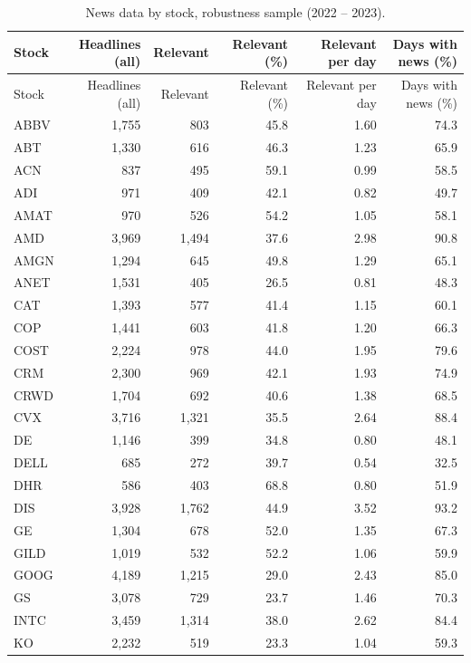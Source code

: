 \documentclass[12pt,a4paper]{article}
\begin{document}
\begin{longtable}{lrrrrr}
\caption[News data by stock, robustness sample]{News data by stock, robustness sample (2022 -- 2023).}\label{tab:app-stock-news-rob}\\
\toprule
Stock & Headlines (all) & Relevant & Relevant (\%) & Relevant per day & Days with news (\%) \\
\midrule
\endfirsthead
\toprule
Stock & Headlines (all) & Relevant & Relevant (\%) & Relevant per day & Days with news (\%) \\
\midrule
\endhead
\bottomrule
\endfoot
ABBV & 1{,}755 & 803 & 45.8 & 1.60 & 74.3 \\
ABT & 1{,}330 & 616 & 46.3 & 1.23 & 65.9 \\
ACN & 837 & 495 & 59.1 & 0.99 & 58.5 \\
ADI & 971 & 409 & 42.1 & 0.82 & 49.7 \\
AMAT & 970 & 526 & 54.2 & 1.05 & 58.1 \\
AMD & 3{,}969 & 1{,}494 & 37.6 & 2.98 & 90.8 \\
AMGN & 1{,}294 & 645 & 49.8 & 1.29 & 65.1 \\
ANET & 1{,}531 & 405 & 26.5 & 0.81 & 48.3 \\
CAT & 1{,}393 & 577 & 41.4 & 1.15 & 60.1 \\
COP & 1{,}441 & 603 & 41.8 & 1.20 & 66.3 \\
COST & 2{,}224 & 978 & 44.0 & 1.95 & 79.6 \\
CRM & 2{,}300 & 969 & 42.1 & 1.93 & 74.9 \\
CRWD & 1{,}704 & 692 & 40.6 & 1.38 & 68.5 \\
CVX & 3{,}716 & 1{,}321 & 35.5 & 2.64 & 88.4 \\
DE & 1{,}146 & 399 & 34.8 & 0.80 & 48.1 \\
DELL & 685 & 272 & 39.7 & 0.54 & 32.5 \\
DHR & 586 & 403 & 68.8 & 0.80 & 51.9 \\
DIS & 3{,}928 & 1{,}762 & 44.9 & 3.52 & 93.2 \\
GE & 1{,}304 & 678 & 52.0 & 1.35 & 67.3 \\
GILD & 1{,}019 & 532 & 52.2 & 1.06 & 59.9 \\
GOOG & 4{,}189 & 1{,}215 & 29.0 & 2.43 & 85.0 \\
GS & 3{,}078 & 729 & 23.7 & 1.46 & 70.3 \\
INTC & 3{,}459 & 1{,}314 & 38.0 & 2.62 & 84.4 \\
KO & 2{,}232 & 519 & 23.3 & 1.04 & 59.3 \\

\end{longtable}
\end{document}
